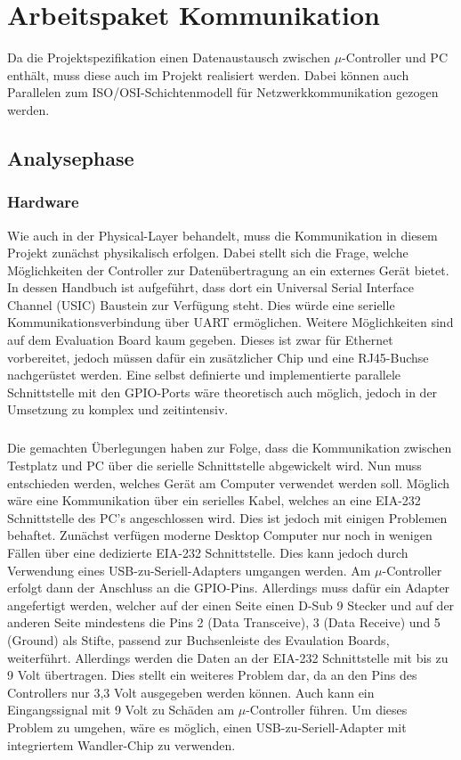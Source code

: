 \chapter{Arbeitspaket Kommunikation}
Da die Projektspezifikation einen Datenaustausch zwischen $\mu$-Controller und PC enthält, muss diese auch im Projekt realisiert werden. Dabei können auch Parallelen zum ISO/OSI-Schichtenmodell für Netzwerkkommunikation gezogen werden.
\section{Analysephase}
\subsection{Hardware}
Wie auch in der Physical-Layer behandelt, muss die Kommunikation in diesem Projekt zunächst physikalisch erfolgen. 
Dabei stellt sich die Frage, welche Möglichkeiten der Controller zur Datenübertragung an ein externes Gerät bietet. In dessen Handbuch ist aufgeführt, dass dort ein Universal Serial Interface Channel (USIC) Baustein zur Verfügung steht. Dies würde eine serielle Kommunikationsverbindung über UART ermöglichen. Weitere Möglichkeiten sind auf dem Evaluation Board kaum gegeben. Dieses ist zwar für Ethernet vorbereitet, jedoch müssen dafür ein zusätzlicher Chip und eine RJ45-Buchse nachgerüstet werden. Eine selbst definierte und implementierte parallele Schnittstelle mit den GPIO-Ports wäre theoretisch auch möglich, jedoch in der Umsetzung zu komplex und zeitintensiv.
\paragraph{}
Die gemachten Überlegungen haben zur Folge, dass die Kommunikation zwischen Testplatz und PC über die serielle Schnittstelle abgewickelt wird. Nun muss entschieden werden, welches Gerät am Computer verwendet werden soll. Möglich wäre eine Kommunikation über ein serielles Kabel, welches an eine EIA-232 Schnittstelle des PC's angeschlossen wird. Dies ist jedoch mit einigen Problemen behaftet. Zunächst verfügen moderne Desktop Computer nur noch in wenigen Fällen über eine dedizierte EIA-232 Schnittstelle. Dies kann jedoch durch Verwendung eines USB-zu-Seriell-Adapters umgangen werden. Am $\mu$-Controller erfolgt dann der Anschluss an die GPIO-Pins. Allerdings muss dafür ein Adapter angefertigt werden, welcher auf der einen Seite einen D-Sub 9 Stecker und auf der anderen Seite mindestens die Pins 2 (Data Transceive), 3 (Data Receive) und 5 (Ground) als Stifte, passend zur Buchsenleiste des Evaulation Boards, weiterführt. Allerdings werden die Daten an der EIA-232 Schnittstelle mit bis zu 9 Volt übertragen. Dies stellt ein weiteres Problem dar, da an den Pins des Controllers nur 3,3 Volt ausgegeben werden können. Auch kann ein Eingangssignal mit 9 Volt zu Schäden am $\mu$-Controller führen. Um dieses Problem zu umgehen, wäre es möglich, einen USB-zu-Seriell-Adapter mit integriertem Wandler-Chip zu verwenden.
